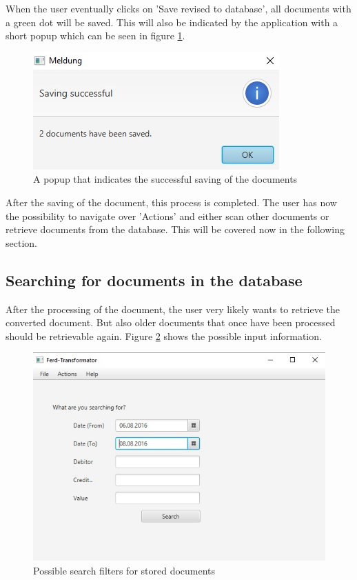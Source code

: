 When the user eventually clicks on 'Save revised to database', all documents with a green dot will be saved. This will also be indicated by the application with a short popup which can be seen in figure \ref{savingSuccessful}.

\begin{figure}[ht!]
\centering
\includegraphics[width=\textwidth]{Images/GUI/SavingSuccessful.jpg}
\caption{A popup that indicates the successful saving of the documents \label{savingSuccessful}}
\end{figure}

After the saving of the document, this process is completed. The user has now the possibility to navigate over 'Actions' and either scan other documents or retrieve documents from the database. This will be covered now in the following section.

\subsection{Searching for documents in the database}
\label{sec5.7.2}

After the processing of the document, the user very likely wants to retrieve the converted document. But also older documents that once have been processed should be retrievable again.
Figure \ref{searchInDatabase} shows the possible input information. 

\begin{figure}[ht!]
\centering
\includegraphics[width=\textwidth]{Images/GUI/SearchInDatabase.jpg}
\caption{Possible search filters for stored documents \label{searchInDatabase}}
\end{figure}

